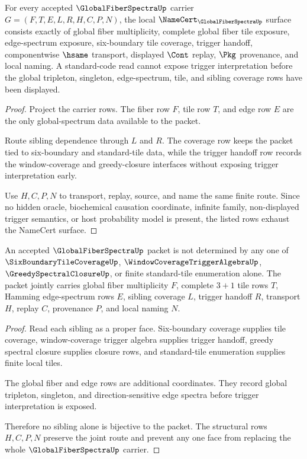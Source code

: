 \begin{theorem}
\label{thm:global-fiber-spectra-namecert-obligations}
For every accepted $\GlobalFiberSpectraUp$ carrier $G=(F,T,E,L,R,H,C,P,N)$, the local $\NameCert_{\GlobalFiberSpectraUp}$ surface consists exactly of global fiber multiplicity, complete global fiber tile exposure, edge-spectrum exposure, six-boundary tile coverage, trigger handoff, componentwise $\hsame$ transport, displayed $\Cont$ replay, $\Pkg$ provenance, and local naming. A standard-code read cannot expose trigger interpretation before the global tripleton, singleton, edge-spectrum, tile, and sibling coverage rows have been displayed.
\end{theorem}
\begin{proof}
Project the carrier rows. The fiber row $F$, tile row $T$, and edge row $E$ are the only global-spectrum data available to the packet.

Route sibling dependence through $L$ and $R$. The coverage row keeps the packet tied to six-boundary and standard-tile data, while the trigger handoff row records the window-coverage and greedy-closure interfaces without exposing trigger interpretation early.

Use $H,C,P,N$ to transport, replay, source, and name the same finite route. Since no hidden oracle, biochemical causation coordinate, infinite family, non-displayed trigger semantics, or host probability model is present, the listed rows exhaust the NameCert surface.
\end{proof}

\begin{theorem}
\label{thm:global-fiber-spectra-sibling-separation}
An accepted $\GlobalFiberSpectraUp$ packet is not determined by any one of $\SixBoundaryTileCoverageUp$, $\WindowCoverageTriggerAlgebraUp$, $\GreedySpectralClosureUp$, or finite standard-tile enumeration alone. The packet jointly carries global fiber multiplicity $F$, complete $3+1$ tile rows $T$, Hamming edge-spectrum rows $E$, sibling coverage $L$, trigger handoff $R$, transport $H$, replay $C$, provenance $P$, and local naming $N$.
\end{theorem}
\begin{proof}
Read each sibling as a proper face. Six-boundary coverage supplies tile coverage, window-coverage trigger algebra supplies trigger handoff, greedy spectral closure supplies closure rows, and standard-tile enumeration supplies finite local tiles.

The global fiber and edge rows are additional coordinates. They record global tripleton, singleton, and direction-sensitive edge spectra before trigger interpretation is exposed.

Therefore no sibling alone is bijective to the packet. The structural rows $H,C,P,N$ preserve the joint route and prevent any one face from replacing the whole $\GlobalFiberSpectraUp$ carrier.
\end{proof}

